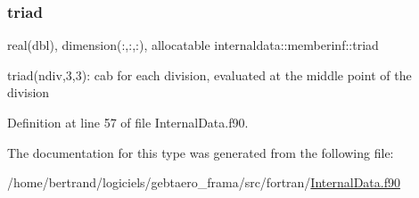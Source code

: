 \subsubsection{\texorpdfstring{triad}{triad}}
{\footnotesize\ttfamily real(dbl), dimension(\+:,\+:,\+:), allocatable internaldata\+::memberinf\+::triad}



triad(ndiv,3,3)\+: cab for each division, evaluated at the middle point of the division 



Definition at line 57 of file Internal\+Data.\+f90.



The documentation for this type was generated from the following file\+:\begin{DoxyCompactItemize}
\item 
/home/bertrand/logiciels/gebtaero\+\_\+frama/src/fortran/\hyperlink{_internal_data_8f90}{Internal\+Data.\+f90}\end{DoxyCompactItemize}
